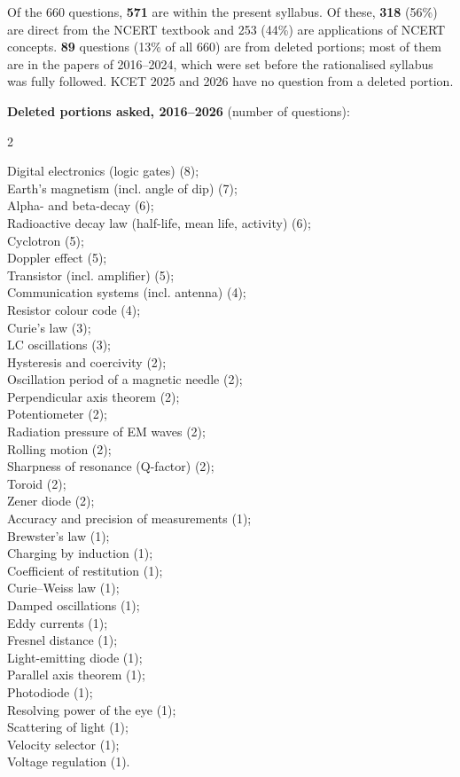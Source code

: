 {\small Of the 660 questions, \textbf{571} are within the present syllabus. Of these, \textbf{318} (56\%) are direct from the NCERT textbook and 253 (44\%) are applications of NCERT concepts. \textbf{89} questions (13\% of all 660) are from deleted portions; most of them are in the papers of 2016--2024, which were set before the rationalised syllabus was fully followed. KCET 2025 and 2026 have no question from a deleted portion.}\par\medskip
{\small\textbf{\color{crimson}Deleted portions asked, 2016--2026} (number of questions):\par\smallskip
\begin{multicols}{2}\raggedright

Digital electronics (logic gates) (8);\\
Earth's magnetism (incl. angle of dip) (7);\\
Alpha- and beta-decay (6);\\
Radioactive decay law (half-life, mean life, activity) (6);\\
Cyclotron (5);\\
Doppler effect (5);\\
Transistor (incl. amplifier) (5);\\
Communication systems (incl. antenna) (4);\\
Resistor colour code (4);\\
Curie's law (3);\\
LC oscillations (3);\\
Hysteresis and coercivity (2);\\
Oscillation period of a magnetic needle (2);\\
Perpendicular axis theorem (2);\\
Potentiometer (2);\\
Radiation pressure of EM waves (2);\\
Rolling motion (2);\\
Sharpness of resonance (Q-factor) (2);\\
Toroid (2);\\
Zener diode (2);\\
Accuracy and precision of measurements (1);\\
Brewster's law (1);\\
Charging by induction (1);\\
Coefficient of restitution (1);\\
Curie--Weiss law (1);\\
Damped oscillations (1);\\
Eddy currents (1);\\
Fresnel distance (1);\\
Light-emitting diode (1);\\
Parallel axis theorem (1);\\
Photodiode (1);\\
Resolving power of the eye (1);\\
Scattering of light (1);\\
Velocity selector (1);\\
Voltage regulation (1).
\end{multicols}}

